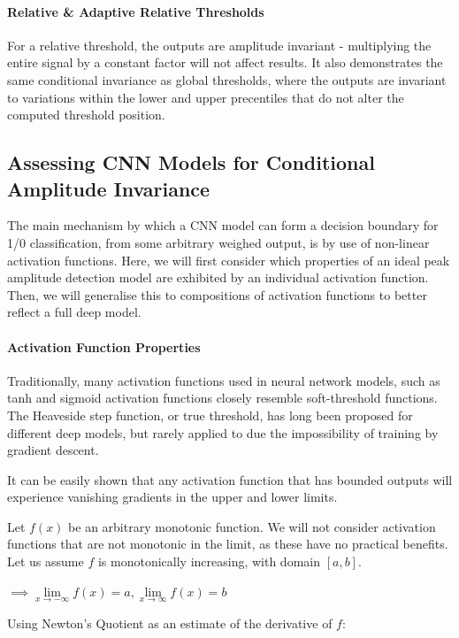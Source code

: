 \documentclass[9pt,conference]{IEEEtran}
\begin{document}
\paragraph{Relative \& Adaptive Relative Thresholds}
For a relative threshold, the outputs are amplitude invariant - multiplying the entire signal by a constant factor will not affect results. It also demonstrates the same conditional invariance as global thresholds, where the outputs are invariant to variations within the lower and upper precentiles that do not alter the computed threshold position.

\subsection{Assessing CNN Models for Conditional Amplitude Invariance}

The main mechanism by which a CNN model can form a decision boundary for 1/0 classification, from some arbitrary weighed output, is by use of non-linear activation functions. Here, we will first consider which properties of an ideal peak amplitude detection model are exhibited by an individual activation function. Then, we will generalise this to compositions of activation functions to better reflect a full deep model.

\paragraph{Activation Function Properties}
Traditionally, many activation functions used in neural network models, such as tanh and sigmoid activation functions closely resemble soft-threshold functions. The Heaveside step function, or true threshold, has long been proposed for different deep models, but rarely applied to due the impossibility of training by gradient descent.

It can be easily shown that any activation function that has bounded outputs will experience vanishing gradients in the upper and lower limits.

Let  $f\left(x\right)$ be an arbitrary monotonic function. We will not consider activation functions that are not monotonic in the limit, as these have no practical benefits. Let us assume $f$ is monotonically increasing, with domain $\left[a,b\right]$.

$ \implies \lim\limits_{x\to -\infty} f\left(x\right) = a, \lim\limits_{x\to \infty} f\left(x\right) = b $

Using Newton's Quotient as an estimate of the derivative of $f$:
\end{document}
